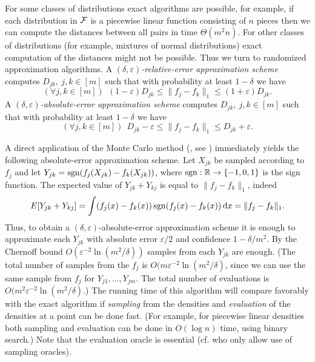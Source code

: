 \documentclass[11pt]{article}
\def\eps{\varepsilon}
\def\R{{\mathbb R}}
\begin{document}
For some classes of distributions exact algorithms are possible, for example, if each distribution in
${\cal F}$ is a piecewise linear function consisting of $n$ pieces then we can compute the distances
between all pairs in time $\Theta(m^2 n)$. For other classes of distributions (for example,
mixtures of normal distributions) exact computation of the distances might not be possible.
Thus we turn to randomized approximation algorithms. A {\em $(\delta,\eps)$-relative-error
approximation scheme} computes $D_{jk},\ j,k\in [m]$ such that with probability at least $1-\delta$ we have
\begin{equation*}\label{rela}
(\forall j,k\in [m])\ \ (1 - \eps) D_{jk} \leq \| f_j - f_k \|_1 \leq (1 + \eps) D_{jk}.
\end{equation*}
A {\em $(\delta,\eps)$-absolute-error approximation scheme} computes $D_{jk},\ j,k\in [m]$ such that
with probability at least $1-\delta$ we have
\begin{equation*}\label{abso}
(\forall j,k\in [m])\ \ D_{jk} - \eps \leq \| f_j - f_k \|_1 \leq D_{jk} + \eps.
\end{equation*}

A direct application of the Monte Carlo method (\cite{MU49}, see \cite{M87}) immediately yields the following
absolute-error approximation scheme. Let $X_{jk}$ be sampled according to $f_j$ and let
$Y_{jk}={\rm sgn}(f_j(X_{jk})-f_k(X_{jk}))$, where ${\rm sgn}:\R\rightarrow\{-1,0,1\}$ is
the sign function. The expected value of $Y_{jk}+Y_{kj}$ is equal to $\|f_j-f_k\|_1$, indeed
$$
E[Y_{jk}+Y_{kj}]=\int (f_j(x)-f_k(x))\,{\rm sgn}(f_j(x)-f_k(x))\,{\rm d}x=\|f_j-f_k\|_1.
$$
Thus, to obtain a $(\delta,\eps)$-absolute-error approximation scheme it is enough to
approximate each $Y_{jk}$ with absolute error $\eps/2$ and confidence $1-\delta/m^2$.
By the Chernoff bound $O(\eps^{-2}\ln(m^2/\delta))$ samples from each $Y_{jk}$ are enough.
(The total number of samples from the $f_j$ is $O(m \eps^{-2}\ln(m^2/\delta)$,
since we can use the same sample from $f_j$ for $Y_{j1},\dots,Y_{jm}$. The total
number of evaluations is $O(m^2 \eps^{-2}\ln(m^2/\delta)$.) The running time of this
algorithm will compare favorably with the exact algorithm if {\em sampling} from the densities
and {\em evaluation} of the densities at a point can be done fast.
(For example, for piecewise linear densities both sampling and evaluation can be done
in $O(\log n)$ time, using binary search.)
Note that the evaluation oracle is essential (cf. \cite{BFRSW00} who only allow use of sampling oracles).
\end{document}
